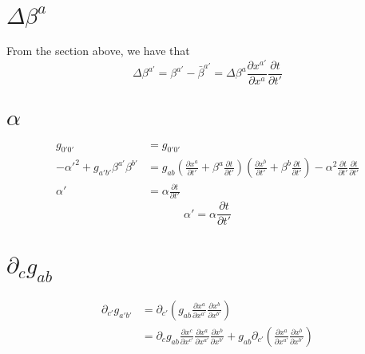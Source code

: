 \documentclass{article}
\begin{document}
\section{$\Delta \beta^{a}$}
From the section above, we have that
{\color{red}
\[
\boxed{
\Delta \beta^{a'} = \beta^{a'} - {\bar \beta}^{a'} = \Delta \beta^{a}\frac{\partial x^{a'}}{\partial x^{a}}\frac{\partial t}{\partial t'}
}
\]
}
\section{$\alpha$}
\begin{align*}
g_{0'0'} & = g_{0'0'}\\
-\alpha'^{2} + g_{a'b'}\beta^{a'}\beta^{b'} & = g_{ab}(\frac{\partial x^{a}}{\partial t'} + \beta^{a}\frac{\partial t}{\partial t'})(\frac{\partial x^{b}}{\partial t'} + \beta^{b}\frac{\partial t}{\partial t'}) - \alpha^2\frac{\partial t}{\partial t'}\frac{\partial t}{\partial t'}\\
\alpha' & = \alpha\frac{\partial t}{\partial t'}
\end{align*}
{\color{red}
\[
\boxed{
\alpha' = \alpha\frac{\partial t}{\partial t'}
}
\]
}
\section{$\partial_{c}g_{ab}$}
\begin{align*}
\partial_{c'}g_{a'b'} & = \partial_{c'}(g_{ab}\frac{\partial x^{a}}{\partial x^{a'}}\frac{\partial x^{b}}{\partial x^{b'}})\\
& = \partial_{c}g_{ab}\frac{\partial x^{c}}{\partial x^{c'}}\frac{\partial x^{a}}{\partial x^{a'}}\frac{\partial x^{b}}{\partial x^{b'}} + g_{ab}\partial_{c'}(\frac{\partial x^{a}}{\partial x^{a'}}\frac{\partial x^{b}}{\partial x^{b'}})
\end{align*}
\end{document}
